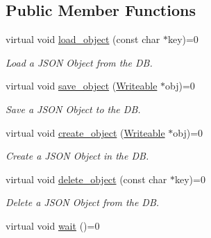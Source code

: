 \subsection*{Public Member Functions}
\begin{DoxyCompactItemize}
\item 
\hypertarget{classDBAdmin_a48ebd30b2e5bb44d23359baa86fe42b9}{virtual void \hyperlink{classDBAdmin_a48ebd30b2e5bb44d23359baa86fe42b9}{load\-\_\-object} (const char $\ast$key)=0}\label{classDBAdmin_a48ebd30b2e5bb44d23359baa86fe42b9}

\begin{DoxyCompactList}\small\item\em Load a J\-S\-O\-N Object from the D\-B. \end{DoxyCompactList}\item 
\hypertarget{classDBAdmin_a29372700a0be4c34ef7ffb956927d9cd}{virtual void \hyperlink{classDBAdmin_a29372700a0be4c34ef7ffb956927d9cd}{save\-\_\-object} (\hyperlink{classWriteable}{Writeable} $\ast$obj)=0}\label{classDBAdmin_a29372700a0be4c34ef7ffb956927d9cd}

\begin{DoxyCompactList}\small\item\em Save a J\-S\-O\-N Object to the D\-B. \end{DoxyCompactList}\item 
\hypertarget{classDBAdmin_aa8915761b88c5ef2df51171ff425c963}{virtual void \hyperlink{classDBAdmin_aa8915761b88c5ef2df51171ff425c963}{create\-\_\-object} (\hyperlink{classWriteable}{Writeable} $\ast$obj)=0}\label{classDBAdmin_aa8915761b88c5ef2df51171ff425c963}

\begin{DoxyCompactList}\small\item\em Create a J\-S\-O\-N Object in the D\-B. \end{DoxyCompactList}\item 
\hypertarget{classDBAdmin_a6fffd56ad4f9db9cd951a91ecb41373b}{virtual void \hyperlink{classDBAdmin_a6fffd56ad4f9db9cd951a91ecb41373b}{delete\-\_\-object} (const char $\ast$key)=0}\label{classDBAdmin_a6fffd56ad4f9db9cd951a91ecb41373b}

\begin{DoxyCompactList}\small\item\em Delete a J\-S\-O\-N Object from the D\-B. \end{DoxyCompactList}\item 
virtual void \hyperlink{classDBAdmin_a9a3ac4ee0b0c6453120fca46e126efe2}{wait} ()=0
\end{DoxyCompactItemize}


